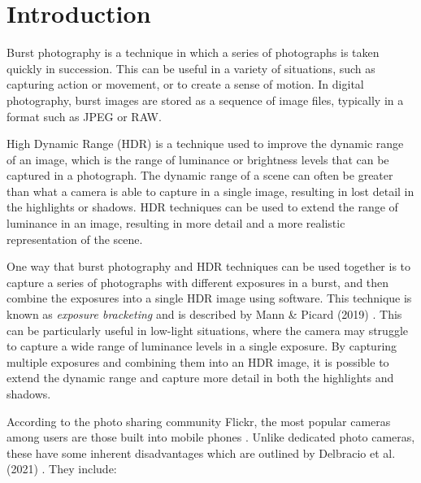 \documentclass{egpubl}
\begin{document}
\section{Introduction}
\label{sec:introduction}

Burst photography is a technique in which a series of photographs is taken quickly in succession.
This can be useful in a variety of situations, such as capturing action or movement, 
or to create a sense of motion. In digital photography, burst images are stored as a 
sequence of image files, typically in a format such as JPEG or RAW.

High Dynamic Range (HDR) is a technique used to improve the dynamic range of an image, 
which is the range of luminance or brightness levels that can be captured in a photograph. 
The dynamic range of a scene can often be greater than what a camera is able to capture 
in a single image, resulting in lost detail in the highlights or shadows. 
HDR techniques can be used to extend the range of luminance in an image, 
resulting in more detail and a more realistic representation of the scene.

One way that burst photography and HDR techniques can be used together
is to capture a series of photographs with different exposures in a burst, and then combine 
the exposures into a single HDR image using software. This technique is known as 
\textit{exposure bracketing} and is described by Mann {\&} Picard (2019) \cite{mann1994bracketing}. 
This can be particularly useful in low-light situations, where the camera may struggle to 
capture a wide range of luminance levels in a single exposure. By capturing multiple exposures and combining them into an 
HDR image, it is possible to extend the dynamic range and capture more detail in both the 
highlights and shadows.

According to the photo sharing community Flickr, the most 
popular cameras among users are those built into mobile phones \cite{flickr2023popularity}. Unlike dedicated photo cameras, these have 
some inherent disadvantages which are outlined by Delbracio et al. (2021) \cite{delbracio2021mobile}. 
They include:
\end{document}
